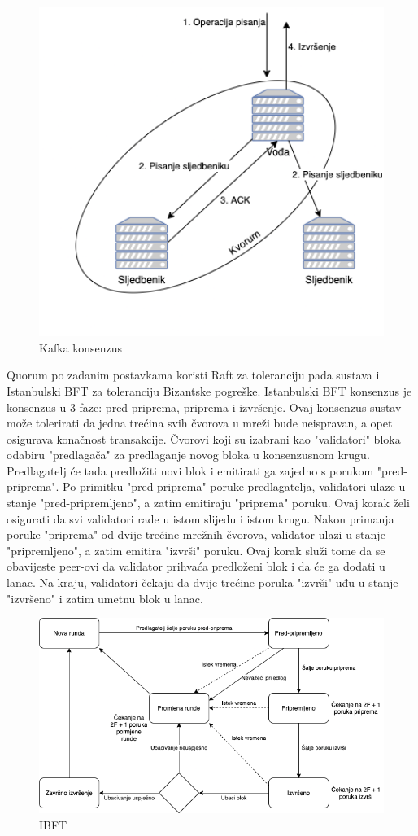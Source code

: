 \documentclass[times, utf8, diplomski]{fer}
\begin{document}
\begin{figure}[htb]
\centering
\includegraphics[width=12cm]{imgs/Kafka.png}
\caption{Kafka konsenzus}
\label{fig:kafka}
\end{figure}

Quorum po zadanim postavkama koristi Raft za toleranciju pada sustava i Istanbulski BFT za toleranciju Bizantske pogreške. Istanbulski BFT konsenzus je konsenzus u 3 faze: pred-priprema, priprema i izvršenje. Ovaj konsenzus sustav može tolerirati da jedna trećina svih čvorova u mreži bude neispravan, a opet osigurava konačnost transakcije. Čvorovi koji su izabrani kao "validatori" bloka odabiru "predlagača" za predlaganje novog bloka u konsenzusnom krugu. Predlagatelj će tada predložiti novi blok i emitirati ga zajedno s porukom "pred-priprema". Po primitku "pred-priprema" poruke predlagatelja, validatori ulaze u stanje "pred-pripremljeno", a zatim emitiraju "priprema" poruku. Ovaj korak želi osigurati da svi validatori rade u istom slijedu i istom krugu. Nakon primanja poruke "priprema" od dvije trećine mrežnih čvorova, validator ulazi u stanje "pripremljeno", a zatim emitira "izvrši" poruku. Ovaj korak služi tome da se obavijeste peer-ovi da validator prihvaća predloženi blok i da će ga dodati u lanac. Na kraju, validatori čekaju da dvije trećine poruka "izvrši" uđu u stanje "izvršeno" i zatim umetnu blok u lanac. \cite{IBFT}

\begin{figure}[htb]
\centering
\includegraphics[width=12cm]{imgs/IBFT.png}
\caption{IBFT}
\label{fig:ibft}
\end{figure}
\end{document}
